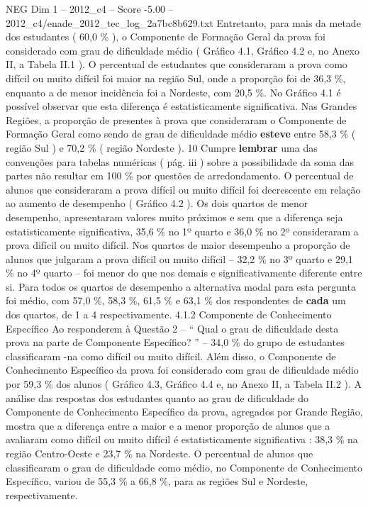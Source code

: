 \begin{textsample}{NEG Dim 1 – 2012\_c4 – Score -5.00 – 2012\_c4/enade\_2012\_tec\_log\_2a7bc8b629.txt}
Entretanto, para mais da metade dos estudantes ( 60,0 \% ), o Componente de Formação Geral da prova foi considerado com grau de dificuldade médio ( Gráfico 4.1, Gráfico 4.2 e, no Anexo II, a Tabela II.1 ).
O percentual de estudantes que consideraram a prova como difícil ou muito difícil foi maior na região Sul, onde a proporção foi de 36,3 \%, enquanto a de menor incidência foi a Nordeste, com 20,5 \%.
No Gráfico 4.1 é possível observar que esta diferença é estatisticamente significativa.
Nas Grandes Regiões, a proporção de presentes à prova que consideraram o Componente de Formação Geral como sendo de grau de dificuldade médio \textbf{esteve} entre 58,3 \% ( região Sul ) e 70,2 \% ( região Nordeste ). 10 Cumpre \textbf{lembrar} uma das convenções para tabelas numéricas ( pág. iii ) sobre a possibilidade da soma das partes não resultar em 100 \% por questões de arredondamento.
O percentual de alunos que consideraram a prova difícil ou muito difícil foi decrescente em relação ao aumento de desempenho ( Gráfico 4.2 ).
Os dois quartos de menor desempenho, apresentaram valores muito próximos e sem que a diferença seja estatisticamente significativa, 35,6 \% no 1º quarto e 36,0 \% no 2º consideraram a prova difícil ou muito difícil.
Nos quartos de maior desempenho a proporção de alunos que julgaram a prova difícil ou muito difícil – 32,2 \% no 3º quarto e 29,1 \% no 4º quarto – foi menor do que nos demais e significativamente diferente entre si.
Para todos os quartos de desempenho a alternativa modal para esta pergunta foi médio, com 57,0 \%, 58,3 \%, 61,5 \% e 63,1 \% dos respondentes de \textbf{cada} um dos quartos, de 1 a 4 respectivamente. 4.1.2 Componente de Conhecimento Específico Ao responderem à Questão 2 – “ Qual o grau de dificuldade desta prova na parte de Componente Específico? ” – 34,0 \% do grupo de estudantes classificaram -na como difícil ou muito difícil.
Além disso, o Componente de Conhecimento Específico da prova foi considerado com grau de dificuldade médio por 59,3 \% dos alunos ( Gráfico 4.3, Gráfico 4.4 e, no Anexo II, a Tabela II.2 ).
A análise das respostas dos estudantes quanto ao grau de dificuldade do Componente de Conhecimento Específico da prova, agregados por Grande Região, mostra que a diferença entre a maior e a menor proporção de alunos que a avaliaram como difícil ou muito difícil é estatisticamente significativa : 38,3 \% na região Centro-Oeste e 23,7 \% na Nordeste.
O percentual de alunos que classificaram o grau de dificuldade como médio, no Componente de Conhecimento Específico, variou de 55,3 \% a 66,8 \%, para as regiões Sul e Nordeste, respectivamente.

\end{textsample}
